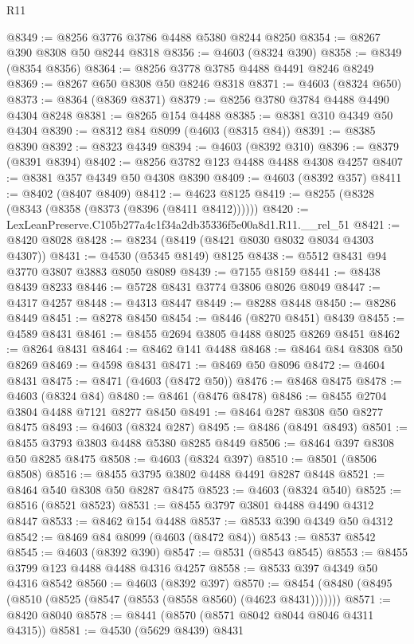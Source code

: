 \begin{lexlean}{R11}
\begin{coremodule}
@8349 := @8256 @3776 @3786 @4488 @5380 @8244 @8250
@8354 := @8267 @390 @8308 @50 @8244 @8318
@8356 := @4603 (@8324 @390)
@8358 := @8349 (@8354 @8356)
@8364 := @8256 @3778 @3785 @4488 @4491 @8246 @8249
@8369 := @8267 @650 @8308 @50 @8246 @8318
@8371 := @4603 (@8324 @650)
@8373 := @8364 (@8369 @8371)
@8379 := @8256 @3780 @3784 @4488 @4490 @4304 @8248
@8381 := @8265 @154 @4488
@8385 := @8381 @310 @4349 @50 @4304
@8390 := @8312 @84 @8099 (@4603 (@8315 @84))
@8391 := @8385 @8390
@8392 := @8323 @4349
@8394 := @4603 (@8392 @310)
@8396 := @8379 (@8391 @8394)
@8402 := @8256 @3782 @123 @4488 @4488 @4308 @4257
@8407 := @8381 @357 @4349 @50 @4308 @8390
@8409 := @4603 (@8392 @357)
@8411 := @8402 (@8407 @8409)
@8412 := @4623 @8125
@8419 := @8255 (@8328 (@8343 (@8358 (@8373 (@8396 (@8411 @8412))))))
@8420 := LexLeanPreserve.C105b277a4c1f34a2db35336f5e00a8d1.R11.__rel_51
@8421 := @8420 @8028
@8428 := @8234 (@8419 (@8421 @8030 @8032 @8034 @4303 @4307))
@8431 := @4530 (@5345 @8149) @8125
@8438 := @5512 @8431 @94 @3770 @3807 @3883 @8050 @8089
@8439 := @7155 @8159
@8441 := @8438 @8439 @8233
@8446 := @5728 @8431 @3774 @3806 @8026 @8049
@8447 := @4317 @4257
@8448 := @4313 @8447
@8449 := @8288 @8448
@8450 := @8286 @8449
@8451 := @8278 @8450
@8454 := @8446 (@8270 @8451) @8439
@8455 := @4589 @8431
@8461 := @8455 @2694 @3805 @4488 @8025 @8269 @8451
@8462 := @8264 @8431
@8464 := @8462 @141 @4488
@8468 := @8464 @84 @8308 @50 @8269
@8469 := @4598 @8431
@8471 := @8469 @50 @8096
@8472 := @4604 @8431
@8475 := @8471 (@4603 (@8472 @50))
@8476 := @8468 @8475
@8478 := @4603 (@8324 @84)
@8480 := @8461 (@8476 @8478)
@8486 := @8455 @2704 @3804 @4488 @7121 @8277 @8450
@8491 := @8464 @287 @8308 @50 @8277 @8475
@8493 := @4603 (@8324 @287)
@8495 := @8486 (@8491 @8493)
@8501 := @8455 @3793 @3803 @4488 @5380 @8285 @8449
@8506 := @8464 @397 @8308 @50 @8285 @8475
@8508 := @4603 (@8324 @397)
@8510 := @8501 (@8506 @8508)
@8516 := @8455 @3795 @3802 @4488 @4491 @8287 @8448
@8521 := @8464 @540 @8308 @50 @8287 @8475
@8523 := @4603 (@8324 @540)
@8525 := @8516 (@8521 @8523)
@8531 := @8455 @3797 @3801 @4488 @4490 @4312 @8447
@8533 := @8462 @154 @4488
@8537 := @8533 @390 @4349 @50 @4312
@8542 := @8469 @84 @8099 (@4603 (@8472 @84))
@8543 := @8537 @8542
@8545 := @4603 (@8392 @390)
@8547 := @8531 (@8543 @8545)
@8553 := @8455 @3799 @123 @4488 @4488 @4316 @4257
@8558 := @8533 @397 @4349 @50 @4316 @8542
@8560 := @4603 (@8392 @397)
@8570 := @8454 (@8480 (@8495 (@8510 (@8525 (@8547 (@8553 (@8558 @8560) (@4623 @8431)))))))
@8571 := @8420 @8040
@8578 := @8441 (@8570 (@8571 @8042 @8044 @8046 @4311 @4315))
@8581 := @4530 (@5629 @8439) @8431

\end{coremodule}
\end{lexlean}
